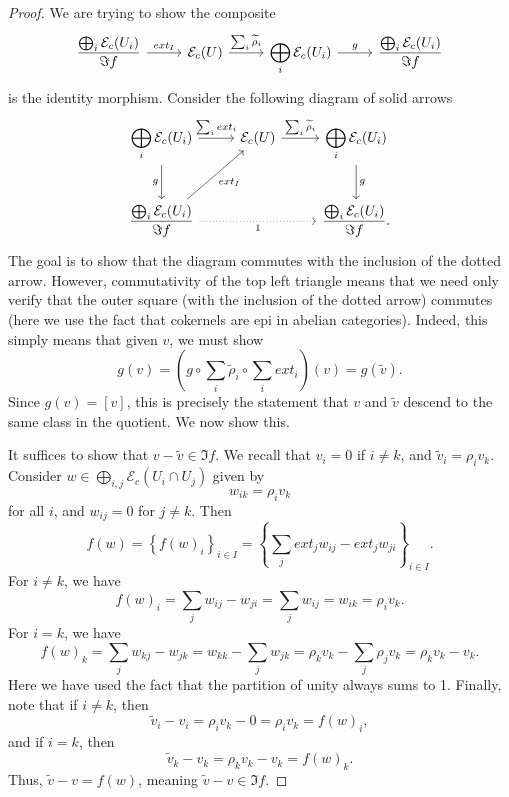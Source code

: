 \begin{proof}
	We are trying to show the composite
	\[\begin{tikzcd}[row sep = 2.5em, column sep = 2.5em]
		\displaystyle{\frac{\bigoplus_{i} \mathcal{E} _c(U_i)}{\Im f} \ar[" ext_I ", r] } & \mathcal{E} _c(U) \ar[" \sum_{i} \widetilde{\rho } _i ", r]  & \displaystyle{\bigoplus_{i} \mathcal{E} _c(U_i)} \ar[" g ", r] & \displaystyle{\frac{\bigoplus_{i} \mathcal{E} _c(U_i)}{\Im f} }
	\end{tikzcd}\]
	is the identity morphism. Consider the following diagram of solid arrows
	\[\begin{tikzcd}[row sep = 2.5em, column sep = 2.5em]
		\displaystyle{\bigoplus_{i} \mathcal{E} _c(U_i)}\ar[" \sum_{i} ext_i ", r] \ar[" g "', d]  & \mathcal{E} _c(U)\ar[" \sum_{i} \widetilde{\rho } _i ", r]  & \displaystyle{\bigoplus_{i} \mathcal{E} _c(U_i)}\ar[" g ", d]  \\
		\displaystyle{\frac{\bigoplus_{i} \mathcal{E} _c(U_i)}{\Im f} } \ar[" ext_I "', ur] \ar[" 1 "', dotted, rr] &  & \displaystyle{\frac{\bigoplus_{i} \mathcal{E} _c(U_i)}{\Im f} }.
	\end{tikzcd}\]
	The goal is to show that the diagram commutes with the inclusion of the dotted arrow. However, commutativity of the top left triangle means that we need only verify that the outer square (with the inclusion of the dotted arrow) commutes (here we use the fact that cokernels are epi in abelian categories). Indeed, this simply means that given $v$, we must show
	\[
		g(v) = \left( g\circ \sum_{i} \widetilde{\rho } _i \circ \sum_{i} ext_i \right) (v) = g( \widetilde{v} )
	.\]
	Since $g(v) = [v]$, this is precisely the statement that $v$ and $\widetilde{v} $ descend to the same class in the quotient. We now show this.

	It suffices to show that $v - \widetilde{v} \in \Im f$. We recall that $v_i = 0$ if $i\neq k$, and $\widetilde{v} _i = \rho _iv_k$. Consider $w\in \bigoplus_{i,j} \mathcal{E}_c(U_i \cap U_j)$ given by
	\[
		w_{ik} =\rho _iv_k
	\]
	for all $i$, and $w_{ij} =0$ for $j\neq k$. Then
	\[
		f(w) = \left\{ f(w)_i \right\}_{i\in I} =\left\{ \sum_{j} ext_jw_{ij} -ext_jw_{ji}  \right\}_{i\in I} 
	.\]
	For $i\neq k$, we have
	\[
		f(w)_i = \sum_{j} w_{ij} -w_{ji} =\sum_{j} w_{ij} = w_{ik} =\rho _iv_k
	.\]
	For $i=k$, we have
	\[
		f(w)_k = \sum_{j} w_{kj} - w_{jk} =w_{kk} -\sum_{j} w_{jk} =\rho _kv_k - \sum_{j} \rho _jv_k = \rho _kv_k - v_k
	.\]
	Here we have used the fact that the partition of unity always sums to 1. Finally, note that if $i\neq k$, then
	\[
		\widetilde{v} _i - v_i = \rho _iv_k - 0 = \rho _iv_k = f(w)_i,
	\]
	and if $i=k$, then
	\[
		\widetilde{v} _k - v_k = \rho _kv_k - v_k = f(w)_k
	.\]
	Thus, $\widetilde{v} -v=f(w)$, meaning $\widetilde{v} -v\in \Im f$.


\end{proof}
